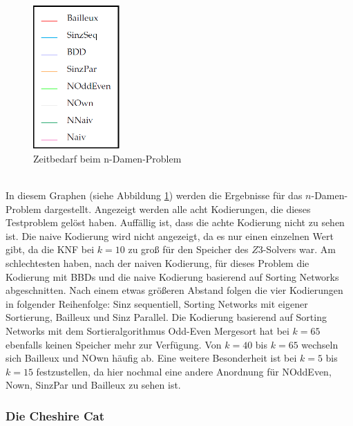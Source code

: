 \documentclass[a4,abstract=on]{scrartcl}
\begin{document}
\begin{figure}[htbp]
\includegraphics[width=3.3cm]{legende.png}
\caption{Zeitbedarf beim n-Damen-Problem}
\label{fig:damen}
\end{figure}
\ \\
In diesem Graphen (siehe Abbildung \ref{fig:damen}) werden die Ergebnisse für das $n$-Damen-Problem dargestellt. Angezeigt werden alle acht Kodierungen, die dieses Testproblem gelöst haben. Auffällig ist, dass die achte Kodierung nicht zu sehen ist. Die naive Kodierung wird nicht angezeigt, da es nur einen einzelnen Wert gibt, da die KNF bei $k=10$ zu groß für den Speicher des $Z3$-Solvers war. Am schlechtesten haben, nach der naiven Kodierung, für dieses Problem die Kodierung mit BBDs und die naive Kodierung basierend auf Sorting Networks abgeschnitten. Nach einem etwas größeren Abstand folgen die vier Kodierungen in folgender Reihenfolge: Sinz sequentiell, Sorting Networks mit eigener Sortierung, Bailleux und Sinz Parallel. Die Kodierung basierend auf Sorting Networks mit dem Sortieralgorithmus Odd-Even Mergesort hat bei $k=65$ ebenfalls keinen Speicher mehr zur Verfügung. Von $k=40$ bis $k=65$ wechseln sich Bailleux und NOwn häufig ab. Eine weitere Besonderheit ist bei $k=5$ bis $k=15$ festzustellen, da hier nochmal eine andere Anordnung für NOddEven, Nown, SinzPar und Bailleux zu sehen ist. 

\subsubsection*{Die Cheshire Cat}
\end{document}
